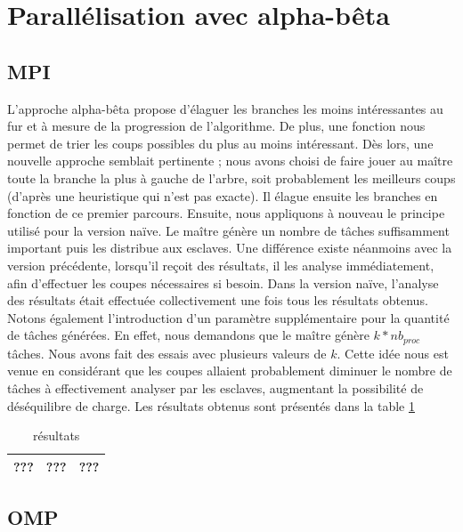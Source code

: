\documentclass[12pt]{article}
\begin{document}
\section{Parallélisation avec alpha-bêta}
    \subsection{MPI}
    L'approche alpha-bêta propose d'élaguer les branches
    les moins intéressantes au fur et à mesure de la progression de 
    l'algorithme. De plus, une fonction nous permet de trier les coups
    possibles du plus au moins intéressant. Dès lors, une nouvelle 
    approche semblait pertinente ; nous avons choisi de faire jouer au
    maître toute la branche la plus à gauche de l'arbre, soit
    probablement les meilleurs coups (d'après une heuristique qui n'est pas 
    exacte). Il élague ensuite les branches en fonction de ce premier
    parcours. Ensuite, nous appliquons à nouveau le principe utilisé pour
    la version naïve. Le maître génère un nombre de tâches suffisamment
    important puis les distribue aux esclaves. Une différence existe
    néanmoins avec la version précédente, lorsqu'il reçoit des résultats,
    il les analyse immédiatement, afin d'effectuer les coupes nécessaires
    si besoin. Dans la version naïve, l'analyse des résultats était
    effectuée collectivement une fois tous les résultats obtenus.
    Notons également l'introduction d'un paramètre supplémentaire pour
    la quantité de tâches générées. En effet, nous demandons que le maître
    génère $k*nb_{proc}$ tâches. Nous avons fait des essais avec plusieurs
    valeurs de $k$. Cette idée nous est venue en considérant que les coupes
    allaient probablement diminuer le nombre de tâches à effectivement
    analyser par les esclaves, augmentant la possibilité de déséquilibre
    de charge. Les résultats obtenus sont présentés dans la table
    \ref{tab:alpha}
    \begin{table} \begin{center}
    	\begin{tabular}{|c|c|c|}
    	\hline
    	??? & ??? & ??? \\ \hline
    	\end{tabular}
    	\caption{\label{tab:alpha}\color{red} résultats}
    \end{center} \end{table}
    \subsection{OMP}
\end{document}
